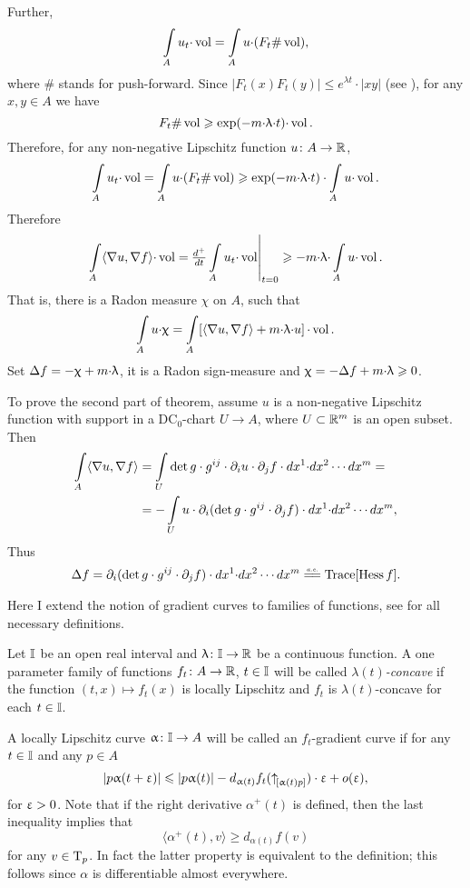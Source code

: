 \documentclass[oneside,a4paper]{article}
\begin{document}
Further,
$$\int\limits_A u_t{\cdot}\mathop{\rm vol}\nolimits=\int\limits_A u{\cdot}(F_t\#\mathop{\rm vol}\nolimits),$$ 
where $\#$ stands for push-forward. 
Since $|F_t(x)F_t(y)|\le e^{\lambda t}{\cdot}|x y|$  
(see \cite[2.1.4(i)]{petrunin:survey}), 
for any $x,y\in A$ we have
$$F_t\#\mathop{\rm vol}\nolimits\geqslant \exp(-m{\cdot}\uplambda{\cdot} t){\cdot}\mathop{\rm vol}\nolimits.$$
Therefore, for any non-negative Lipschitz function $u\colon A\to\mathbb{R}$,
$$\int\limits_A u_t{\cdot}\mathop{\rm vol}\nolimits
=
\int\limits_A u{\cdot} (F_t\#\mathop{\rm vol}\nolimits)
\geqslant
\exp(-m{\cdot}\uplambda{\cdot} t)\cdot\int\limits_A u{\cdot}\mathop{\rm vol}\nolimits.$$
Therefore
$$\int\limits_A\langle\nabla u,\nabla f\rangle{\cdot}\mathop{\rm vol}\nolimits 
=
\!\left.\tfrac{d^+}{d t}\int\limits_A u_t{\cdot}\mathop{\rm vol}\nolimits\right|_{t=0}
\geqslant
-m{\cdot}\uplambda{\cdot}\int\limits_A u{\cdot}\mathop{\rm vol}\nolimits.$$
That is, there is a Radon measure $\chi$ on $A$, such that
$$\int\limits_A u{\cdot}\upchi
=
\int\limits_A\!\left[\langle\nabla u,\nabla f\rangle+m{\cdot}\uplambda{\cdot} u\right]{\cdot}\mathop{\rm vol}\nolimits.$$
Set $\Delta f=-\upchi+m{\cdot}\uplambda$, 
it is a Radon sign-measure and $\upchi=-\Delta f+m{\cdot}\uplambda\geqslant 0$.

To prove the second part of theorem,
assume $u$ is a non-negative Lipschitz function with support in a DC$_0$-chart $U\to A$,
where $U\subset \mathbb{R}^m$ is an open subset.
Then 
\begin{align*}
\int\limits_A\langle\nabla u,\nabla f\rangle
&=
\int\limits_U \det g\cdot g^{i j}\cdot\partial_i u\cdot\partial_j f \cdot 
d x^1{\cdot}d x^2\cdots d x^m
=
\\
&=-\int\limits_U u\cdot\partial_i(\det g\cdot g^{i j}\cdot\partial_j f) \cdot d x^1{\cdot}d x^2\cdots d x^m,
\end{align*}
Thus 
$$\Lap f
=
\partial_i(\det g\cdot g^{i j}\cdot\partial_j f)\cdot d x^1{\cdot}d x^2\cdots d x^m
\ae \Trace[\Hess f].$$
\qedsf

 Here I extend the notion of gradient curves to  families of functions, see \cite{petrunin:survey} for all necessary definitions.

Let $\mathbb{I}$ be an open real interval
and $\uplambda\colon\mathbb{I}\to\mathbb{R}$ be a continuous function.
A one parameter family of functions $f_t\colon A\to \mathbb{R}$, $t\in \mathbb{I}$ will be called \emph{$\lambda(t)$-concave} if the function $(t,x)\mapsto f_t(x)$ is locally Lipschitz 
and $f_t$ is $\lambda(t)$-concave for each $t\in \mathbb{I}$.

A locally Lipschitz curve $\upalpha\colon\mathbb{I}\to A$ will be called an $f_t$-gradient curve
if for any $t\in \mathbb{I}$ and any $p\in A$ 
\[|p\upalpha(t+\upvarepsilon)|\leqslant |p\upalpha(t)|-d_{\upalpha(t)}f_t({\uparrow}_{\![{\upalpha(t)}{p}]})\cdot\upvarepsilon+o(\upvarepsilon),\]
for $\upvarepsilon>0$.
Note that if the right derivative $\alpha^+(t)$ is defined, then the last inequality implies that
\[\langle\alpha^+(t),v\rangle\ge d_{\alpha(t)}f(v)\]
for any $v\in\text{\rm T}_p$.
In fact the latter property is equivalent to the definition;
this follows since $\alpha$ is differentiable almost everywhere.
\end{document}
